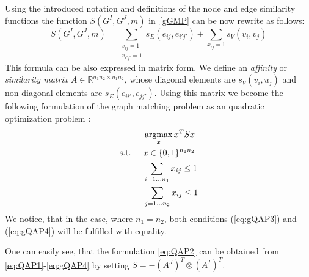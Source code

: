 Using the introduced notation and definitions of the node and edge similarity functions the function $S(G^I,G^J,m)$ in~\eqref{gGMP} can be now rewrite as follows:
\begin{equation}
	S(G^I,G^J,m)=\sum_{\substack{x_{ij}=1\\x_{i'j'}=1}}s_E(e_{ij},e_{i'j'}) + \sum_{x_{ij}=1}s_V(v_{i},v_{j})
\end{equation}
This formula can be also expressed in matrix form. We define an \emph{affinity} or \emph{similarity matrix} $A\in\mathbb{R}^{n_1n_2\times n_1n_2}$, whose diagonal elements are $s_V(v_i, u_j)$ and non-diagonal elements are $s_E(e_{ii\prime}, e_{jj\prime})$. Using this matrix we become the following formulation of the graph matching problem as an quadratic optimization problem \cite{Cho2014_Haystack, Cho2010_RRWM, Cho2012_ProgressiveGM, Conte2004}:
\begin{alignat}{2}
    &     && \argmax_x{x^TSx}                           \label{eq:gQAP1}\\ %
    & \text{s.t. } &&  x\in \{0,1\}^{n_1n_2}            \label{eq:gQAP2}\\
    &             &&  \sum_{i=1\dots n_1} x_{ij}\le 1    \label{eq:gQAP3}\\
    &             &&  \sum_{j=1\dots n_2} x_{ij}\le 1    \label{eq:gQAP4}
\end{alignat}
We notice, that in the case, where $n_1=n_2$, both conditions (\ref{eq:gQAP3}) and (\ref{eq:gQAP4}) will be fulfilled with equality.

One can easily see, that the formulation \eqref{eq:QAP2} can be obtained from \eqref{eq:QAP1}-\eqref{eq:gQAP4} by setting $S=-(A^J)^T\otimes(A^I)^T$.

